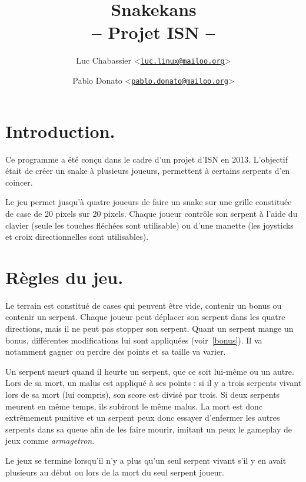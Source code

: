 \documentclass{article}
\title{Snakekans\\-- Projet ISN --}
\author{Luc Chabassier <\href{mailto:luc.linux@mailoo.org}{\nolinkurl{luc.linux@mailoo.org}}> \and Pablo Donato <\href{mailto:pablo.donato@mailoo.org}{\nolinkurl{pablo.donato@mailoo.org}}>}
\begin{document}
\maketitle

\tableofcontents

\section{Introduction.}
Ce programme a été conçu dans le cadre d'un projet d'ISN en 2013. L'objectif était de créer un snake à plusieurs joueurs, permettent à certains serpents d'en coincer.

Le jeu permet jusqu'à quatre joueurs de faire un snake sur une grille constituée de case de 20 pixels sur 20 pixels. Chaque joueur contrôle son serpent à l'aide du clavier (seule les touches fléchées sont utilisable) ou d'une manette (les joysticks et croix directionnelles sont utilisables).

\section{Règles du jeu.}
Le terrain est constitué de cases qui peuvent être vide, contenir un bonus ou contenir un serpent. Chaque joueur peut déplacer son serpent dans les quatre directions, mais il ne peut pas stopper son serpent. Quant un serpent mange un bonus, différentes modifications lui sont appliquées (voir~\ref{bonus}). Il va notamment gagner ou perdre des points et sa taille va varier.

Un serpent meurt quand il heurte un serpent, que ce soit lui-même ou un autre. Lors de sa mort, un malus est appliqué à ses points : si il y a trois serpents vivant lors de sa mort (lui compris), son score est divisé par trois. Si deux serpents meurent en même temps, ils subiront le même malus. La mort est donc extrêmement punitive et un serpent peux donc essayer d'enfermer les autres serpents dans sa queue afin de les faire mourir, imitant un peux le gameplay de jeux comme \emph{armagetron}.

Le jeux se termine lorsqu'il n'y a plus qu'un seul serpent vivant s'il y en avait plusieurs au début ou lors de la mort du seul serpent joueur.
\end{document}
